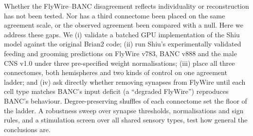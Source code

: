 Whether the FlyWire--BANC disagreement reflects individuality or reconstruction has not been
tested. Nor has a third connectome been placed on the same agreement scale, or the observed
agreement been compared with a null. Here we address these gaps. We (i) validate a batched
GPU implementation of the Shiu model against the original Brian2 code; (ii) run Shiu's
experimentally validated feeding and grooming predictions on FlyWire v783, BANC v888 and the
male CNS v1.0 under three pre-specified weight normalisations; (iii) place all three
connectomes, both hemispheres and two kinds of control on one agreement ladder; and (iv) ask
directly whether removing synapses from FlyWire until each cell type matches BANC's input
deficit (a ``degraded FlyWire'') reproduces BANC's behaviour. Degree-preserving shuffles of
each connectome \citep{maslov2002} set the floor of the ladder. A robustness sweep over
synapse thresholds, normalisations and sign rules, and a stimulation screen over all shared
sensory types, test how general the conclusions are.
